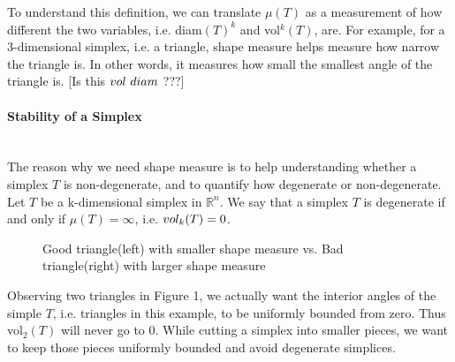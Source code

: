     To understand this definition, we can translate $\mu({{T}})$ as a measurement of how different the two variables, i.e. diam$({T})^k$ and vol$^k({T})$, are. For example, for a 3-dimensional simplex, i.e. a triangle, shape measure helps measure how narrow the triangle is. In other words, it measures how small the smallest angle of the triangle is. [Is this $vol~diam$ ???]

    \paragraph{Stability of a Simplex}\mbox{}\\
    The reason why we need shape measure is to help understanding whether a simplex $T$ is non-degenerate, and to quantify how degenerate or non-degenerate. Let $T$ be a k-dimensional simplex in $\mathbb{R}^n$. We say that a simplex $T$ is degenerate if and only if $\mu({T}) = \infty$, i.e. $vol_k(T) = 0$. 

    
    \begin{figure}
    \centering
    \caption{Good triangle(left) with smaller shape measure vs. Bad triangle(right) with larger shape measure}
    \label{Fig1}
    \end{figure}

    Observing two triangles in Figure 1, we actually want the interior angles of the simple $T$, i.e. triangles in this example, to be uniformly bounded from zero. Thus vol$_2(T)$ will never go to 0.
    While cutting a simplex into smaller pieces, we want to keep those pieces uniformly bounded and avoid degenerate simplices. \\

